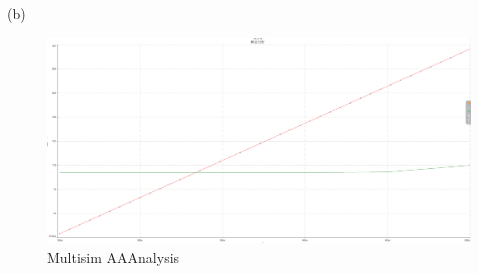\documentclass[a4paper,11pt,UTF8]{article}
\begin{document}
(b)
\begin{figure}[H] 
	\centering 
	\includegraphics[scale=0.25]{MD2.58_1}
	\caption{Multisim AAAnalysis}
\end{figure}
\end{document}
